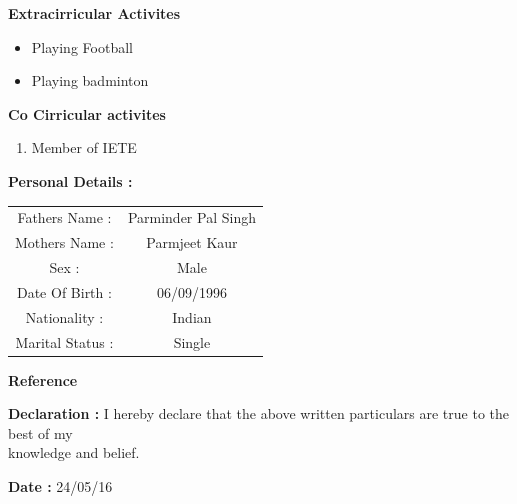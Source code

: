 \documentclass{article}
\begin{document}
\begin{flushleft}
\textbf{Extracirricular Activites}
\begin{flushright}
\begin{itemize}
\item Playing Football
\item Playing badminton
\end{itemize} 
\end{flushright}
\end{flushleft}



\begin{flushleft}
\textbf{Co Cirricular activites }
\begin{flushright}
\begin{enumerate}
\item Member of IETE
\end{enumerate} 
\end{flushright}
\end{flushleft}



\begin{flushleft}
\textbf {Personal Details :  }
\vskip 0.2cm
\hspace{1.4in}
\begin{tabular}{ cc } 
 \hfill Fathers Name : & Parminder Pal Singh \\ 
 \hfill Mothers Name : & Parmjeet Kaur \\  
 \hfill Sex : & Male   \\ 
 \hfill Date Of Birth : & 06/09/1996  \\
 \hfill Nationality : & Indian  \\
 \hfill Marital Status : & Single
\end{tabular}
\end{flushleft}





\begin{flushleft}
\textbf{Reference}
\end{flushleft}

\vskip 0.3cm


\begin{flushleft}
\textbf{Declaration : }
 I hereby declare that the above written particulars are true to the best of my \\
\hspace{1in}
knowledge and belief.
\end{flushleft}


\begin{flushleft}
\textbf {Date :}\hspace{1.37cm} {24/05/16 }
\end{flushleft}
\end{document}
